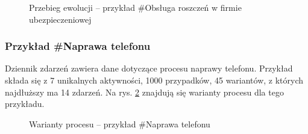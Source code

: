 \begin{figure}[H]
	\caption{\label{fig:p3_chart}Przebieg ewolucji -- przykład \#Obsługa roszczeń w firmie ubezpieczeniowej}
\end{figure}

\subsubsection{Przykład \#Naprawa telefonu}
Dziennik zdarzeń zawiera dane dotyczące procesu naprawy telefonu.
Przykład składa się z 7 unikalnych aktywności, 1000 przypadków, 45 wariantów, z których najdłuższy ma 14 zdarzeń. Na rys. \ref{fig:p4_variants} znajdują się warianty procesu dla tego przykładu.

\begin{figure}[H]
	\caption{\label{fig:p4_variants}Warianty procesu -- przykład \#Naprawa telefonu}
\end{figure}

